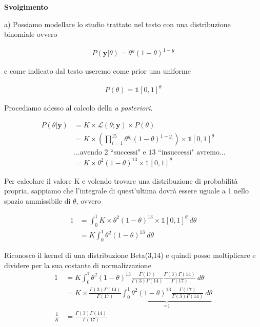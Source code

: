 \textbf{Svolgimento}
\bigskip

a) Possiamo modellare lo studio trattato nel testo con una distribuzione binomiale ovvero

\begin{align*}
    P(\textbf{y}|\theta) = \theta^{y}(1-\theta)^{1-y}
\end{align*}

e come indicato dal testo useremo come prior una uniforme

\begin{align*}
    P(\theta)= \mathds{1}[0,1]^\theta
\end{align*}

Procediamo adesso al calcolo della \textit{a posteriori}.

\begin{align*}
    P(\theta|\textbf{y}) &= K  \times \mathcal{L}(\theta;\textbf{y})\times P(\theta)\\
    &= K \times \left(\prod_{i=1}^{15}\theta^{y_i}(1-\theta)^{1-y_i}\right)\times\mathds{1}[0,1]^\theta\\
    &\text{...avendo 2 ``successi" e 13 ``insuccessi" avremo...} \\
    &= K \times \theta^2(1-\theta)^{13} \times \mathds{1}[0,1]^\theta
\end{align*}

Per calcolare il valore K e volendo trovare una distribuzione di probabilità propria, sappiamo che l'integrale di quest'ultima dovrà essere uguale a 1 nello spazio ammissibile di $\theta$, ovvero

\begin{align*}
   1 &= \int_0^1 K \times \theta^2(1-\theta)^{13} \times \mathds{1}[0,1]^\theta\ d\theta \\
    &= K \int_0^1  \theta^2(1-\theta)^{13}\ d\theta
\end{align*}

Riconosco il kernel di una distribuzione Beta(3,14) e quindi posso moltiplicare e dividere per la sua costante di normalizzazione
\begin{align*}
    1 &= K \int_0^1  \theta^2(1-\theta)^{13} \frac{\Gamma(17)}{\Gamma(3)\Gamma(14)} \frac{\Gamma(3)\Gamma(14)}{\Gamma(17)}\ d\theta\\
    &= K \times \frac{\Gamma(3)\Gamma(14)}{\Gamma(17)} \underbrace{\int_0^1  \theta^2(1-\theta)^{13} \frac{\Gamma(17)}{\Gamma(3)\Gamma(14)}\ d\theta}_\text{=1}\\
    \frac{1}{K}&=\frac{\Gamma(3)\Gamma(14)}{\Gamma(17)}
\end{align*}

